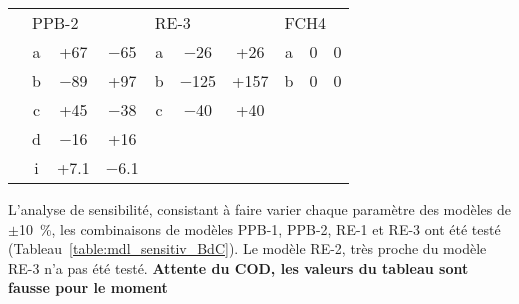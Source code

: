 \begin{table}
\begin{tabular}{cccccccccc}
& \multicolumn{3}{l}{PPB-2} & \multicolumn{3}{l}{RE-3} & \multicolumn{3}{l}{FCH4} \\ [+.5ex]
& a & +\num{67} & \num{-65} & a & \num{-26} & +\num{26} & a & 0 & 0\\
& b & \num{-89} & +\num{97} & b & \num{-125} & +\num{157} & b & 0 & 0\\
& c & +\num{45} & \num{-38} & c & \num{-40} & +\num{40} & & &\\
& d & \num{-16} & +\num{16} & & & & & &\\
& i & +\num{7.1} & \num{-6.1} & & & & & &\\[+1ex]

\bottomrule
\end{tabular}
\end{table}

L'analyse de sensibilité, consistant à faire varier chaque paramètre des modèles de $\pm$\SI{10}{\percent}, les combinaisons de modèles PPB-1, PPB-2, RE-1 et RE-3 ont été testé (Tableau~\ref{table:mdl_sensitiv_BdC}).
Le modèle RE-2, très proche du modèle RE-3 n'a pas été testé.
\textbf{Attente du COD, les valeurs du tableau sont fausse pour le moment}




